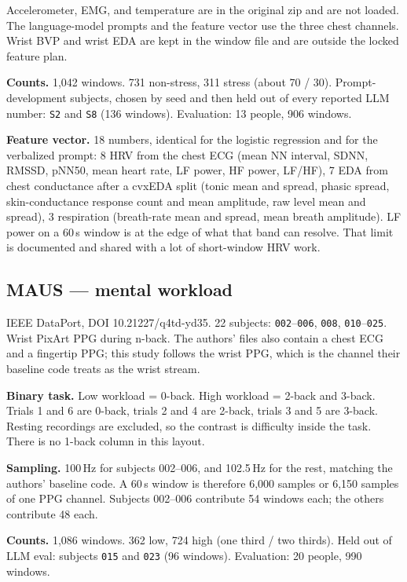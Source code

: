 \documentclass[11pt]{article}
\begin{document}
Accelerometer, EMG, and temperature are in the original zip and are not loaded. The language-model prompts and the feature vector use the three chest channels. Wrist BVP and wrist EDA are kept in the window file and are outside the locked feature plan.

\textbf{Counts.} 1{,}042 windows. 731 non-stress, 311 stress (about 70 / 30). Prompt-development subjects, chosen by seed and then held out of every reported LLM number: \texttt{S2} and \texttt{S8} (136 windows). Evaluation: 13 people, 906 windows.

\textbf{Feature vector.} 18 numbers, identical for the logistic regression and for the verbalized prompt:
8 HRV from the chest ECG (mean NN interval, SDNN, RMSSD, pNN50, mean heart rate, LF power, HF power, LF/HF),
7 EDA from chest conductance after a cvxEDA split (tonic mean and spread, phasic spread, skin-conductance response count and mean amplitude, raw level mean and spread),
3 respiration (breath-rate mean and spread, mean breath amplitude).
LF power on a 60\,s window is at the edge of what that band can resolve. That limit is documented and shared with a lot of short-window HRV work.

\subsection{MAUS --- mental workload}

IEEE DataPort, DOI 10.21227/q4td-yd35. 22 subjects: \texttt{002}--\texttt{006}, \texttt{008}, \texttt{010}--\texttt{025}. Wrist PixArt PPG during n-back. The authors' files also contain a chest ECG and a fingertip PPG; this study follows the wrist PPG, which is the channel their baseline code treats as the wrist stream.

\textbf{Binary task.} Low workload = 0-back. High workload = 2-back and 3-back. Trials 1 and 6 are 0-back, trials 2 and 4 are 2-back, trials 3 and 5 are 3-back. Resting recordings are excluded, so the contrast is difficulty inside the task. There is no 1-back column in this layout.

\textbf{Sampling.} 100\,Hz for subjects 002--006, and 102.5\,Hz for the rest, matching the authors' baseline code. A 60\,s window is therefore 6{,}000 samples or 6{,}150 samples of one PPG channel. Subjects 002--006 contribute 54 windows each; the others contribute 48 each.

\textbf{Counts.} 1{,}086 windows. 362 low, 724 high (one third / two thirds). Held out of LLM eval: subjects \texttt{015} and \texttt{023} (96 windows). Evaluation: 20 people, 990 windows.
\end{document}
